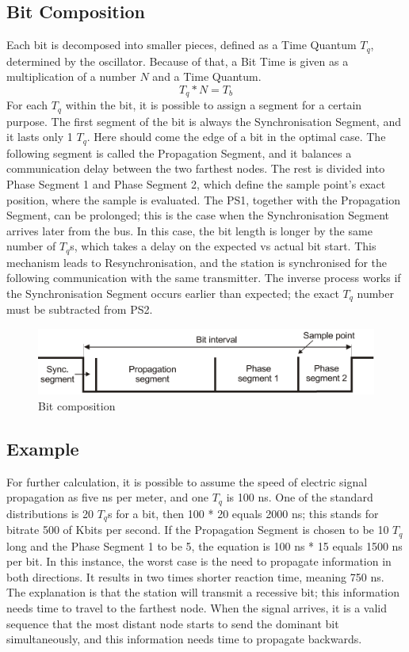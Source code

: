 \documentclass{ctuthesis}
\begin{document}
 \subsection{Bit Composition}
 Each bit is decomposed into smaller pieces, defined as a Time Quantum $T_{q}$, determined by the oscillator. Because of that, a Bit Time is given as a multiplication of a number $N$ and a Time Quantum.
 \begin{equation}
 T_{q} * N = T_{b}
\end{equation}
 For each $T_{q}$ within the bit, it is possible to assign a segment for a certain purpose. The first segment of the bit is always the Synchronisation Segment, and it lasts only 1 $T_{q}$. Here should come the edge of a bit in the optimal case. The following segment is called the Propagation Segment, and it balances a communication delay between the two farthest nodes. The rest is divided into Phase Segment 1 and Phase Segment 2, which define the sample point's exact position, where the sample is evaluated. The PS1, together with the Propagation Segment, can be prolonged; this is the case when the Synchronisation Segment arrives later from the bus. In this case, the bit length is longer by the same number of $T_{q}$s, which takes a delay on the expected vs actual bit start. This mechanism leads to Resynchronisation, and the station is synchronised for the following communication with the same transmitter. The inverse process works if the Synchronisation Segment occurs earlier than expected; the exact $T_{q}$ number must be subtracted from PS2.
 
\begin{figure}[H]
 \includegraphics[width=1\textwidth]{images/can-bittiming.pdf}
 \caption{Bit composition \cite{can-course}}
\end{figure}
 
 \subsection{Example}
 For further calculation, it is possible to assume the speed of electric signal propagation as five ns per meter, and one $T_{q}$ is 100 ns. One of the standard distributions is 20 $T_{q}$s for a bit, then 100 * 20 equals 2000 ns; this stands for bitrate 500 of Kbits per second. If the Propagation Segment is chosen to be 10 $T_{q}$ long and the Phase Segment 1 to be 5, the equation is 100 ns * 15  equals 1500 ns per bit. In this instance, the worst case is the need to propagate information in both directions. It results in two times shorter reaction time, meaning 750 ns. The explanation is that the station will transmit a recessive bit; this information needs time to travel to the farthest node. When the signal arrives, it is a valid sequence that the most distant node starts to send the dominant bit simultaneously, and this information needs time to propagate backwards. 
\end{document}

